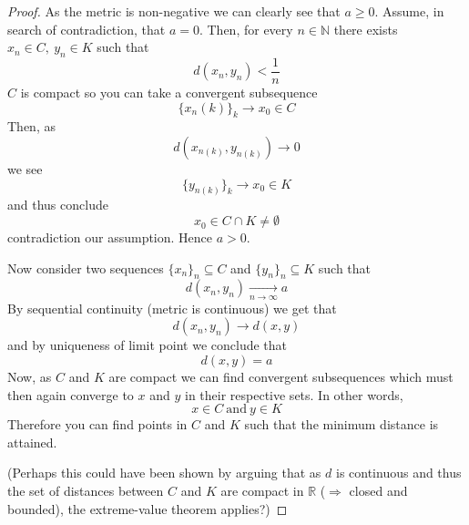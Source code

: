 \begin{proof}
    As the metric is non-negative we can clearly see that 
    $a \geq 0$. Assume, in search of contradiction, that 
    $a = 0$.
    Then, for every $n \in \mathbb N$ there exists 
    $x_n \in C, \: y_n \in K$ such that 
    \[
        d(x_n, y_n) < \frac{1}{n}
    \]
    $C$ is compact so you can take a convergent subsequence 
    \[
        \{x_n(k)\}_k \to x_0 \in C
    \]
    Then, as  
    \[
        d(x_{n(k)}, y_{n(k)}) \to 0
    \]
    we see 
    \[
        \{y_{n(k)}\}_k \to x_0 \in K
    \]
    and thus conclude 
    \[
        x_0 \in C \cap K \neq \emptyset 
    \]
    contradiction our assumption. Hence $a > 0$. 

    Now consider two sequences $\{x_n\}_n \subseteq C$ 
    and $\{y_n\}_n \subseteq K$ such that 
    \[
        d(x_n, y_n) \underset{n \to \infty}{\to} a
    \]
    By sequential continuity (metric is continuous) we 
    get that 
    \[
        d(x_n, y_n) \to d(x,y)
    \]
    and by uniqueness of limit point we conclude that 
    \[
        d(x,y) = a
    \]
    Now, as $C$ and $K$ are compact we can find 
    convergent subsequences which must then again 
    converge to $x$ and $y$ in their respective sets. 
    In other words, 
    \[
        x \in C \ \text{and} \ y \in K
    \]
    Therefore you can find points in $C$ and $K$ such that 
    the minimum distance is attained. 

    (Perhaps this could have been shown by arguing that 
    as $d$ is continuous and thus the set of distances 
    between $C$ and $K$ are compact in $\mathbb R$ 
    ($\Rightarrow$ closed and bounded), the 
    extreme-value theorem applies?)
\end{proof}

